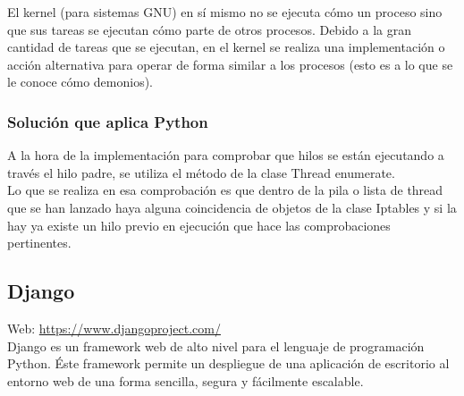El kernel (para sistemas GNU) en sí mismo no se ejecuta cómo un proceso sino que sus tareas se ejecutan cómo parte de otros procesos. Debido a la gran cantidad de tareas que se ejecutan, en el kernel se realiza una implementación o acción alternativa para operar de forma similar a los procesos (esto es a lo que se le conoce cómo demonios).\\

\subsubsection{Solución que aplica Python}

A la hora de la implementación para comprobar que hilos se están ejecutando a través el hilo padre, se utiliza el método de la clase Thread enumerate.\\

Lo que se realiza en esa comprobación es que dentro de la pila o lista de thread que se han lanzado haya alguna coincidencia de objetos de la clase Iptables y si la hay ya existe un hilo previo en ejecución que hace las comprobaciones pertinentes.\\



\subsection{Django}


Web: \url{https://www.djangoproject.com/}\\

Django es un framework web de alto nivel para el lenguaje de programación Python. Éste framework permite un despliegue de una aplicación de escritorio al entorno web de una forma sencilla, segura y fácilmente escalable. \\

